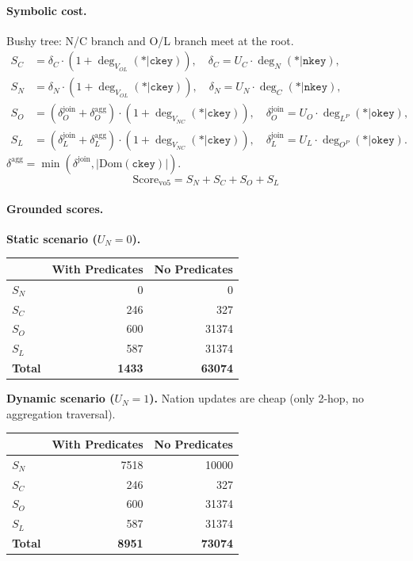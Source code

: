\paragraph{Symbolic cost.}
Bushy tree: N/C branch and O/L branch meet at the root.
\begin{align*}
S_C &= \delta_C \cdot (1 + \deg_{V_{OL}}(*|\texttt{ckey})),
\quad \delta_C = U_C \cdot \deg_N(*|\texttt{nkey}), \\[4pt]
S_N &= \delta_N \cdot (1 + \deg_{V_{OL}}(*|\texttt{ckey})),
\quad \delta_N = U_N \cdot \deg_C(*|\texttt{nkey}), \\[4pt]
S_O &= (\delta^{\mathrm{join}}_O + \delta^{\mathrm{agg}}_O) \cdot (1 + \deg_{V_{NC}}(*|\texttt{ckey})),
\quad \delta^{\mathrm{join}}_O = U_O \cdot \deg_{L^P}(*|\texttt{okey}),\\[4pt]
S_L &= (\delta^{\mathrm{join}}_L + \delta^{\mathrm{agg}}_L) \cdot (1 + \deg_{V_{NC}}(*|\texttt{ckey})),
\quad \delta^{\mathrm{join}}_L = U_L \cdot \deg_{O^P}(*|\texttt{okey}).
\end{align*}
$\delta^{\mathrm{agg}} = \min(\delta^{\mathrm{join}}, |\mathrm{Dom}(\texttt{ckey})|)$.
\[
\boxed{\mathrm{Score}_{\mathrm{vo5}} = S_N + S_C + S_O + S_L}
\]

\paragraph{Grounded scores.}

\smallskip
\noindent\textbf{Static scenario ($U_N = 0$).}
\begin{center}
\begin{tabular}{lrr}
\toprule
& With Predicates & No Predicates \\
\midrule
$S_N$ & 0 & 0 \\
$S_C$ & 246 & 327 \\
$S_O$ & 600 & 31374 \\
$S_L$ & 587 & 31374 \\
\midrule
\textbf{Total} & \textbf{1433} & \textbf{63074} \\
\bottomrule
\end{tabular}
\end{center}

\smallskip
\noindent\textbf{Dynamic scenario ($U_N = 1$).}
Nation updates are cheap (only 2-hop, no aggregation traversal).
\begin{center}
\begin{tabular}{lrr}
\toprule
& With Predicates & No Predicates \\
\midrule
$S_N$ & 7518 & 10000 \\
$S_C$ & 246 & 327 \\
$S_O$ & 600 & 31374 \\
$S_L$ & 587 & 31374 \\
\midrule
\textbf{Total} & \textbf{8951} & \textbf{73074} \\
\bottomrule
\end{tabular}
\end{center}

